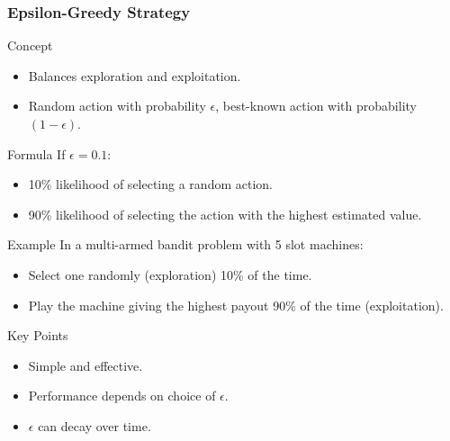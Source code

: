 \documentclass[aspectratio=169]{beamer}
\begin{document}
\begin{frame}[fragile]
    \frametitle{Epsilon-Greedy Strategy}
    \begin{block}{Concept}
        \begin{itemize}
            \item Balances exploration and exploitation.
            \item Random action with probability $\epsilon$, best-known action with probability $(1 - \epsilon)$.
        \end{itemize}
    \end{block}
    
    \begin{block}{Formula}
        If $\epsilon = 0.1$:
        \begin{itemize}
            \item 10\% likelihood of selecting a random action.
            \item 90\% likelihood of selecting the action with the highest estimated value.
        \end{itemize}
    \end{block}

    \begin{block}{Example}
        In a multi-armed bandit problem with 5 slot machines:
        \begin{itemize}
            \item Select one randomly (exploration) 10\% of the time.
            \item Play the machine giving the highest payout 90\% of the time (exploitation).
        \end{itemize}
    \end{block}
    
    \begin{block}{Key Points}
        \begin{itemize}
            \item Simple and effective.
            \item Performance depends on choice of $\epsilon$.
            \item $\epsilon$ can decay over time.
        \end{itemize}
    \end{block}
\end{frame}
\end{document}
